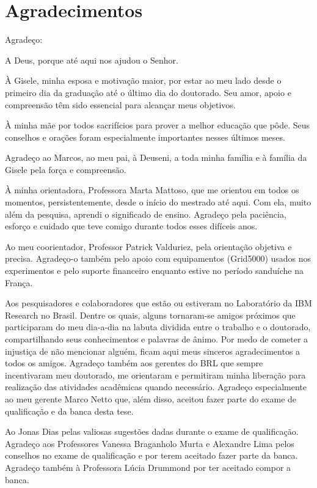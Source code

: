 \chapter*{Agradecimentos}

Agradeço:

A Deus, porque até aqui nos ajudou o Senhor. 

À Gisele, minha esposa e motivação maior, por estar ao meu lado desde o primeiro dia da graduação até o último dia do doutorado. Seu amor, apoio e compreensão têm sido essencial para alcançar meus objetivos.

À minha mãe por todos sacrifícios para prover a melhor educação que pôde. Seus conselhos e orações foram especialmente importantes nesses últimos meses. 

Agradeço ao Marcos, ao meu pai, à Deuseni, a toda minha família e à família da Gisele pela força e compreensão.

À minha orientadora, Professora Marta Mattoso, 
que me orientou em todos os momentos, persistentemente, desde o início do mestrado até aqui. Com ela, muito além da pesquisa, aprendi o significado de ensino. Agradeço pela paciência, esforço e cuidado que teve comigo durante todos esses difíceis anos. 

Ao meu coorientador, Professor Patrick Valduriez, pela orientação objetiva e precisa. Agradeço-o também pelo apoio com equipamentos (Grid5000) usados nos experimentos e pelo suporte financeiro enquanto estive no período sanduíche na França.

Aos pesquisadores e colaboradores que estão ou estiveram no Laboratório da IBM Research no Brasil. Dentre os quais, alguns tornaram-se amigos próximos que participaram do meu dia-a-dia na labuta dividida entre o trabalho e o doutorado, compartilhando seus conhecimentos e palavras de ânimo. Por medo de cometer a injustiça de não mencionar alguém, ficam aqui meus sinceros agradecimentos a todos os amigos. Agradeço também aos gerentes do BRL que sempre incentivaram meu doutorado, me orientaram e permitiram minha liberação para realização das atividades acadêmicas quando necessário. Agradeço especialmente ao meu gerente Marco Netto que, além disso, aceitou fazer parte do exame de qualificação e da banca desta tese.

Ao Jonas Dias pelas valiosas sugestões dadas durante o exame de qualificação. Agradeço aos Professores Vanessa Braganholo Murta e Alexandre Lima pelos conselhos no exame de qualificação e por terem aceitado fazer parte da banca. Agradeço também à Professora Lúcia Drummond por ter aceitado compor a banca.

